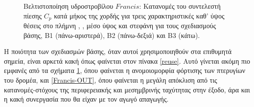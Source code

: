 \begin{figure}[h!]
\begin{minipage}[b]{1\linewidth}
\end{minipage}
\caption{Βελτιστοποίηση υδροστροβίλου $Francis$: Κατανομές του συντελεστή πίεσης $C_p$ κατά μήκος της χορδής για τρεις χαρακτηριστικές καθ' ύψος  θέσεις στο πλήμνη , , μέσο ύψος  και στεφάνη   για τους σχεδιασμούς βάσης, Β1 (πάνω-αριστερά), Β2 (πάνω-δεξιά) και Β3 (κάτω).}
\label{Francis-LOAD}
\end{figure}


Η ποιότητα των σχεδιασμών βάσης, όταν αυτοί χρησιμοποιηθούν στα επιθυμητά σημεία, είναι αρκετά κακή όπως φαίνεται στον πίνακα \ref{reuse}. Αυτό γίνεται ακόμη πιο εμφανές από τα σχήματα \ref{Francis-LOAD}, όπου φαίνεται η ανομοιομορφία φόρτισης των πτερυγίων του δρομέα, και \ref{Francis-OUT}, όπου φαίνεται η μεγάλη απόκλιση από τις κατανομές-στόχους της περιφερειακής και μεσημβρινής ταχύτητας στην έξοδο, άρα και η κακή συνεργασία που θα είχαν με τον αγωγό απαγωγής.         


